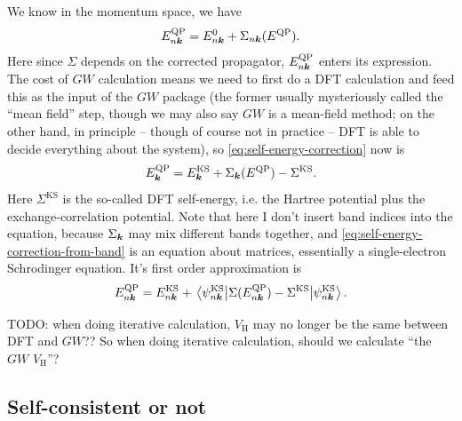 \documentclass[hyperref, a4paper, 12pt]{report}
\begin{document}
We know in the momentum space, we have 
\begin{equation}
    E^{\text{QP}}_{n \vb*{k}} = E^{0}_{n \vb*{k}} + \Sigma_{n \vb*{k}} (E^{\text{QP}}).
    \label{eq:self-energy-correction}
\end{equation}
Here since $\Sigma$ depends on the corrected propagator,
$E^\text{QP}_{n \vb*{k}}$ enters its expression.
The cost of $GW$ calculation means we need to first do a DFT calculation 
and feed this as the input of the $GW$ package 
(the former usually mysteriously called the ``mean field'' step,
though we may also say $GW$ is a mean-field method;
on the other hand, in principle -- though of course not in practice -- 
DFT is able to decide everything about the system), 
so \eqref{eq:self-energy-correction} now is 
\begin{equation}
    E^{\text{QP}}_{\vb*{k}} = E^{\text{KS}}_{\vb*{k}} + \Sigma_{\vb*{k}} (E^{\text{QP}}) - \Sigma^{\text{KS}}.
    \label{eq:self-energy-correction-from-band}
\end{equation}
Here $\Sigma^{\text{KS}}$ is the so-called DFT self-energy,
i.e. the Hartree potential plus the exchange-correlation potential.
Note that here I don't insert band indices into the equation,
because $\Sigma_{\vb*{k}}$ may mix different bands together,
and \eqref{eq:self-energy-correction-from-band} is an equation about matrices,
essentially a single-electron Schrodinger equation.
It's first order approximation is
\begin{equation}
    E^{\text{QP}}_{n \vb*{k}} = E^{\text{KS}}_{n \vb*{k}} + 
    \mel{\psi^{\text{KS}}_{n \vb*{k}}}{\Sigma (E^{\text{QP}}_{n \vb*{k}}) - \Sigma^{\text{KS}}}{\psi^{\text{KS}}_{n \vb*{k}}}.
    \label{eq:self-energy-first-order}
\end{equation}

TODO: when doing iterative calculation, $V_{\text{H}}$ may no longer be the same between DFT and $GW$??
So when doing iterative calculation, should we calculate ``the $GW$ $V_{\text{H}}$''?

\subsection{Self-consistent or not}\label{sec:gw-bse.accuracy.self-consistent}
\end{document}
